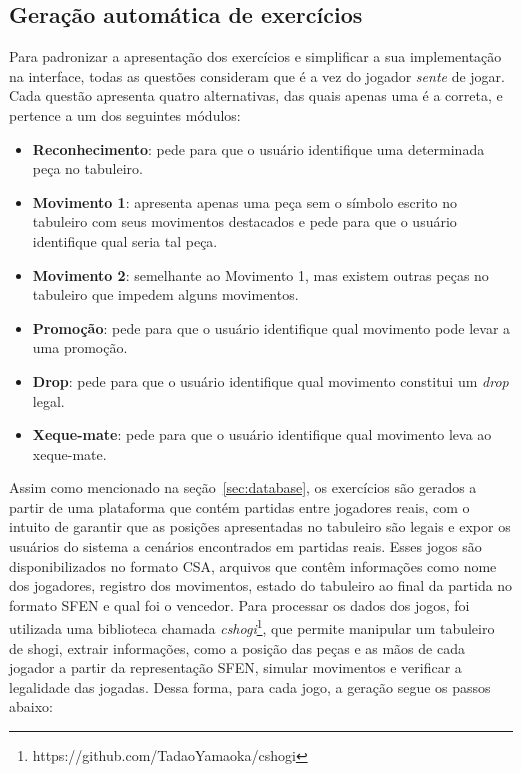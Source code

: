     
    \subsection{Geração automática de exercícios}
    Para padronizar a apresentação dos exercícios e simplificar a sua implementação na interface, todas as questões consideram que é a vez do jogador \textit{sente} de jogar.
    Cada questão apresenta quatro alternativas, das quais apenas uma é a correta, e pertence a um dos seguintes módulos:
    \begin{itemize}
        \item \textbf{Reconhecimento}: pede para que o usuário identifique uma determinada peça no tabuleiro.
        \item \textbf{Movimento 1}: apresenta apenas uma peça sem o símbolo escrito no tabuleiro com seus movimentos destacados e pede para que o usuário identifique qual seria tal peça.
        \item \textbf{Movimento 2}: semelhante ao Movimento 1, mas existem outras peças no tabuleiro que impedem alguns movimentos.
        \item \textbf{Promoção}: pede para que o usuário identifique qual movimento pode levar a uma promoção. 
        \item \textbf{Drop}: pede para que o usuário identifique qual movimento constitui um \textit{drop} legal.
        \item \textbf{Xeque-mate}: pede para que o usuário identifique qual movimento leva ao xeque-mate.
    \end{itemize}

    Assim como mencionado na seção~\ref{sec:database}, os exercícios são gerados a partir de uma plataforma que contém partidas entre jogadores reais, com o intuito de garantir que as posições apresentadas no tabuleiro são legais e expor os usuários do sistema a cenários encontrados em partidas reais. Esses jogos são disponibilizados no formato CSA, arquivos que contêm informações como nome dos jogadores, registro dos movimentos, estado do tabuleiro ao final da partida no formato SFEN e qual foi o vencedor.
    Para processar os dados dos jogos, foi utilizada uma biblioteca chamada \textit{cshogi}\footnote{https://github.com/TadaoYamaoka/cshogi}, que permite manipular um tabuleiro de shogi, extrair informações, como a posição das peças e as mãos de cada jogador a partir da representação SFEN, simular movimentos e verificar a legalidade das jogadas. Dessa forma, para cada jogo, a geração segue os passos abaixo:


